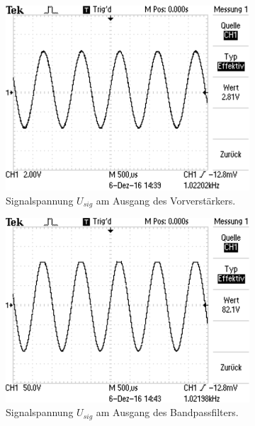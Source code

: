 \begin{figure}
\begin{subfigure}{0.45\textwidth}
    \centering
    \includegraphics[width=\textwidth]{3.png}
    \caption{Signalspannung $U_{sig}$ am Ausgang des Vorverstärkers.}
    \label{sub:3}
    \qquad
  \end{subfigure}
  \begin{subfigure}{0.45\textwidth}
    \centering
    \includegraphics[width=\textwidth]{4.png}
    \caption{Signalspannung $U_{sig}$ am Ausgang des Bandpassfilters.}
    \label{sub:4}
    \qquad
  \end{subfigure} \\
  \begin{subfigure}{0.45\textwidth}
    \centering

\end{subfigure}
\end{figure}
